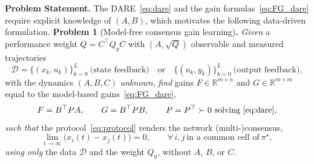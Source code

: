 \documentclass[12pt]{elsarticle}
\theoremstyle{remark}
\newcommand{\R}{\mathbb{R}}
\begin{document}
\textbf{Problem Statement.} The DARE~\eqref{eq:dare} and the gain formulas~\eqref{eq:FG_dare} require explicit knowledge of $(A,B)$, which motivates the following data-driven formulation.
\smallskip
\noindent\textbf{Problem 1} (Model-free consensus gain learning)\textbf{.}
\emph{Given} a performance weight $Q = C^\top Q_y C$ with $(A,\sqrt{Q})$ observable and measured trajectories
\begin{equation}
\mathcal{D} = \big\{(x_k, u_k)\big\}_{k=0}^{L}\ \text{(state feedback)}\quad\text{or}\quad \big\{(u_k, y_k)\big\}_{k=0}^{L}\ \text{(output feedback)},
\label{eq:data}
\end{equation}
with the dynamics $(A,B,C)$ \emph{unknown}, \emph{find} gains $F \in \R^{m\times n}$ and $G \in \R^{m\times m}$ equal to the model-based gains~\eqref{eq:FG_dare},
\begin{equation}
F = B^\top P A, \qquad G = B^\top P B, \qquad P = P^\top \succ 0 \ \text{solving}\ \eqref{eq:dare},
\label{eq:goal_gains}
\end{equation}
\emph{such that} the protocol~\eqref{eq:protocol} renders the network (multi-)consensus,
\begin{equation}
\lim_{t\to\infty}\big(x_i(t) - x_j(t)\big) = 0, \qquad \forall\, i,j\ \text{in a common cell of}\ \pi^\star,
\label{eq:consensus_goal}
\end{equation}
\emph{using only} the data $\mathcal{D}$ and the weight $Q_y$, without $A$, $B$, or $C$.
\end{document}
